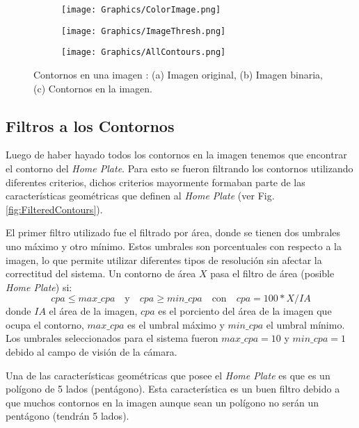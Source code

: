 \begin{figure}[h!]
	\centering
	\begin{subfigure}[b]{0.32\linewidth}
		\centering
		\texttt{[image: Graphics/ColorImage.png]}
		\caption{}
	\end{subfigure}
	\begin{subfigure}[b]{0.32\linewidth}
		\centering
		\texttt{[image: Graphics/ImageThresh.png]}
		\caption{}
	\end{subfigure}    
	\begin{subfigure}[b]{0.32\linewidth}
		\centering
		\texttt{[image: Graphics/AllContours.png]}
		\caption{}
	\end{subfigure}    
	\caption{Contornos en una imagen : (a) Imagen original, (b) Imagen binaria, (c) Contornos en la imagen.}
	\label{fig:ImagesContours}
\end{figure}    

\subsection{Filtros a los Contornos}

Luego de haber hayado todos los contornos en la imagen tenemos que encontrar el contorno del \textit{Home Plate}. Para esto se fueron filtrando los contornos utilizando diferentes criterios, dichos criterios mayormente formaban parte de las características geométricas que definen al \textit{Home Plate} (ver Fig. \ref{fig:FilteredContours}).

El primer filtro utilizado fue el filtrado por área, donde se tienen dos umbrales uno máximo y otro mínimo. Estos umbrales son porcentuales con respecto a la imagen, lo que permite utilizar diferentes tipos de resolución sin afectar la correctitud del sistema. Un contorno de área $X$ pasa el filtro de área (posible \textit{Home Plate}) si:
$$cpa \leq max\_cpa \quad \text{y} \quad cpa \geq min\_cpa \quad \text{con} \quad cpa = 100 * X / IA$$
donde $IA$ el área de la imagen, $cpa$ es el porciento del área de la imagen que ocupa el contorno, $max\_cpa$ es el umbral máximo y $min\_cpa$ el umbral mínimo. Los umbrales seleccionados para el sistema fueron $max\_cpa = 10$ y $min\_cpa = 1$ debido al campo de visión de la cámara.

Una de las características geométricas que posee el \textit{Home Plate} es que es un polígono de 5 lados (pentágono). Esta característica es un buen filtro debido a que muchos contornos en la imagen aunque sean un polígono no serán un pentágono (tendrán 5 lados).


